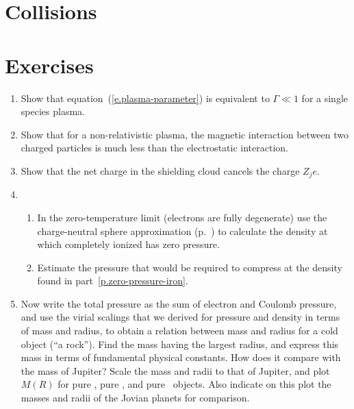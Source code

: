 \section{Collisions}\label{s.plasma-collisions}

\section{Exercises}\label{s.plasma-exercises}
\begin{enumerate}
\item Show that equation~(\ref{e.plasma-parameter}) is equivalent to $\Gamma \ll 1$ for a single species plasma.

\item Show that for a non-relativistic plasma, the magnetic interaction between two charged particles is much less than the electrostatic interaction.

\item Show that the net charge in the shielding cloud cancels the charge $Z_{j}e$.

\item 
\begin{enumerate} 
\item\label{p.zero-pressure-iron} In the zero-temperature limit (electrons are fully degenerate) use the charge-neutral sphere approximation (p.~\pageref{e.madelung-total}) to calculate the density at which completely ionized \iron[56] has zero pressure.

\item Estimate the pressure that would be required to compress \iron[56] at the density found in part~\ref{p.zero-pressure-iron}.
\end{enumerate}

\item Now write the total pressure as the sum of electron and Coulomb pressure, and use the virial scalings that we derived for pressure and density in terms of mass and radius, to obtain a relation between mass and radius for a cold object (``a rock'').  Find the mass having the largest radius, and express this mass in terms of fundamental physical constants.  How does it compare with the mass of Jupiter?  Scale the mass and radii to that of Jupiter, and plot $M(R)$ for pure \hydrogen, pure \helium, and pure \carbon\ objects.  Also indicate on this plot the masses and radii of the Jovian planets for comparison.

\end{enumerate}
